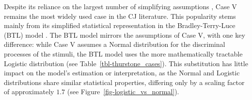 \documentclass[
  authoryear,
  preprint,
  1p]{elsarticle}
\begin{document}
Despite its reliance on the largest number of simplifying assumptions
\citetext{\citealp[pp.~253]{Bramley_2008}; \citealp[pp.~677]{Kelly_et_al_2022}},
Case V remains the most widely used case in the CJ literature. This
popularity stems mainly from its simplified statistical representation
in the Bradley-Terry-Luce (BTL) model
\citep{Bradley_et_al_1952, Luce_1959}. The BTL model mirrors the
assumptions of Case V, with one key difference: while Case V assumes a
Normal distribution for the discriminal processes of the stimuli, the
BTL model uses the more mathematically tractable Logistic distribution
\citep[pp.~254]{Andrich_1978, Bramley_2008} (see
Table~\ref{tbl-thurstone_cases}). This substitution has little impact on
the model's estimation or interpretation, as the Normal and Logistic
distributions share similar statistical properties, differing only by a
scaling factor of approximately \(1.7\)
\citep[pp.~16]{vanderLinden_et_al_2017_I} (see
Figure~\ref{fig-logistic_vs_normal}).
\end{document}
